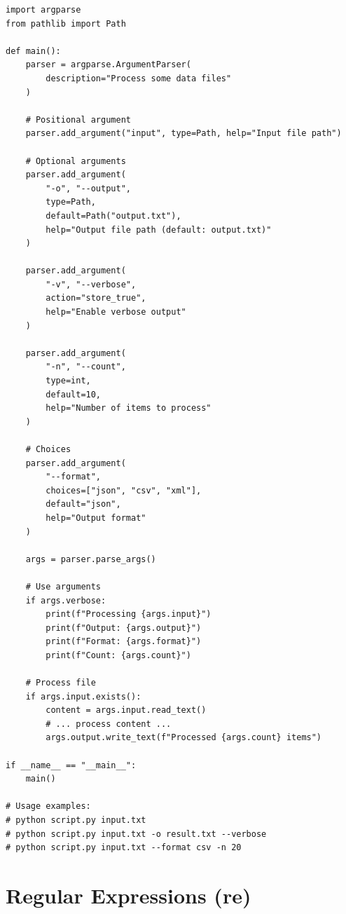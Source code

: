 \begin{lstlisting}
import argparse
from pathlib import Path

def main():
    parser = argparse.ArgumentParser(
        description="Process some data files"
    )

    # Positional argument
    parser.add_argument("input", type=Path, help="Input file path")

    # Optional arguments
    parser.add_argument(
        "-o", "--output",
        type=Path,
        default=Path("output.txt"),
        help="Output file path (default: output.txt)"
    )

    parser.add_argument(
        "-v", "--verbose",
        action="store_true",
        help="Enable verbose output"
    )

    parser.add_argument(
        "-n", "--count",
        type=int,
        default=10,
        help="Number of items to process"
    )

    # Choices
    parser.add_argument(
        "--format",
        choices=["json", "csv", "xml"],
        default="json",
        help="Output format"
    )

    args = parser.parse_args()

    # Use arguments
    if args.verbose:
        print(f"Processing {args.input}")
        print(f"Output: {args.output}")
        print(f"Format: {args.format}")
        print(f"Count: {args.count}")

    # Process file
    if args.input.exists():
        content = args.input.read_text()
        # ... process content ...
        args.output.write_text(f"Processed {args.count} items")

if __name__ == "__main__":
    main()

# Usage examples:
# python script.py input.txt
# python script.py input.txt -o result.txt --verbose
# python script.py input.txt --format csv -n 20
\end{lstlisting}

\section{Regular Expressions (re)}

